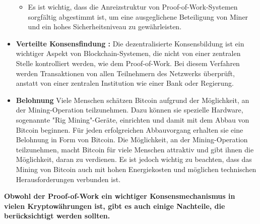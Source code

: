 \documentclass[ngerman]{scrreprt}
\begin{document}
\begin{itemize}
\begin{itemize}
		\item Es ist wichtig, dass die Anreizstruktur von Proof-of-Work-Systemen sorgfältig abgestimmt ist, um eine ausgeglichene Beteiligung von Miner und ein hohes Sicherheitsniveau zu gewährleisten.
	\end{itemize}
	
	\item \textbf{Verteilte Konsensfindung :} Die dezentralisierte Konsensbildung ist ein wichtiger Aspekt von Blockchain-Systemen, die nicht von einer zentralen Stelle kontrolliert werden, wie dem Proof-of-Work. Bei diesem Verfahren werden Transaktionen von allen Teilnehmern des Netzwerks überprüft, anstatt von einer zentralen Institution wie einer Bank oder Regierung. \\
	
	\item \textbf{Belohnung} Viele Menschen schätzen Bitcoin aufgrund der Möglichkeit, an der Mining-Operation teilzunehmen. Dazu können sie spezielle Hardware, sogenannte "Rig Mining"-Geräte, einrichten und damit mit dem Abbau von Bitcoin beginnen. Für jeden erfolgreichen Abbauvorgang erhalten sie eine Belohnung in Form von Bitcoin. Die Möglichkeit, an der Mining-Operation teilzunehmen, macht Bitcoin für viele Menschen attraktiv und gibt ihnen die Möglichkeit, daran zu verdienen. Es ist jedoch wichtig zu beachten, dass das Mining von Bitcoin auch mit hohen Energiekosten und möglichen technischen Herausforderungen verbunden ist. \\ 
\end{itemize}
\textbf{Obwohl der Proof-of-Work ein wichtiger Konsensmechanismus in vielen Kryptowährungen ist, gibt es auch einige Nachteile, die berücksichtigt werden sollten.}
\end{document}
